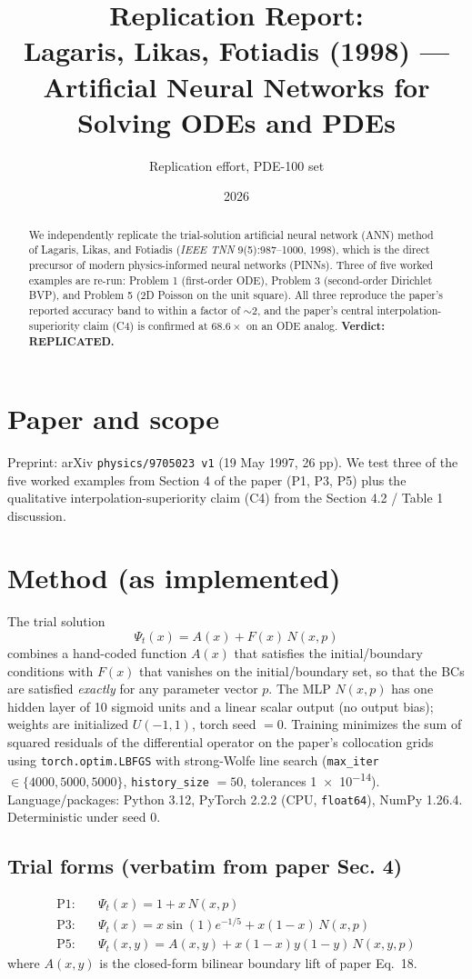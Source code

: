 \documentclass[11pt]{article}
\title{Replication Report:\\
Lagaris, Likas, Fotiadis (1998) --- Artificial Neural Networks for Solving ODEs and PDEs}
\author{Replication effort, PDE-100 set}
\date{2026}
\begin{document}
\maketitle

\begin{abstract}
We independently replicate the trial-solution artificial neural network (ANN)
method of Lagaris, Likas, and Fotiadis (\emph{IEEE TNN} 9(5):987--1000, 1998),
which is the direct precursor of modern physics-informed neural networks
(PINNs). Three of five worked examples are re-run: Problem 1 (first-order
ODE), Problem 3 (second-order Dirichlet BVP), and Problem 5 (2D Poisson on the
unit square). All three reproduce the paper's reported accuracy band to within
a factor of $\sim$2, and the paper's central interpolation-superiority claim
(C4) is confirmed at $68.6\times$ on an ODE analog. \textbf{Verdict:
REPLICATED.}
\end{abstract}

\section{Paper and scope}
Preprint: arXiv \texttt{physics/9705023 v1} (19 May 1997, 26 pp). We test three
of the five worked examples from Section 4 of the paper (P1, P3, P5) plus the
qualitative interpolation-superiority claim (C4) from the Section 4.2 / Table 1
discussion.

\section{Method (as implemented)}
The trial solution
\[
\Psi_t(x) = A(x) + F(x)\,N(x,p)
\]
combines a hand-coded function $A(x)$ that satisfies the initial/boundary
conditions with $F(x)$ that vanishes on the initial/boundary set, so that the
BCs are satisfied \emph{exactly} for any parameter vector $p$. The MLP
$N(x,p)$ has one hidden layer of 10 sigmoid units and a linear scalar output
(no output bias); weights are initialized $U(-1,1)$, torch seed $=0$. Training
minimizes the sum of squared residuals of the differential operator on the
paper's collocation grids using \texttt{torch.optim.LBFGS} with strong-Wolfe
line search (\texttt{max\_iter} $\in\{4000, 5000, 5000\}$, \texttt{history\_size}
$= 50$, tolerances \num{1e-14}). Language/packages: Python 3.12, PyTorch 2.2.2
(CPU, \texttt{float64}), NumPy 1.26.4. Deterministic under seed 0.

\subsection{Trial forms (verbatim from paper Sec. 4)}
\begin{align}
\text{P1:}\quad & \Psi_t(x) = 1 + x\,N(x,p) \\
\text{P3:}\quad & \Psi_t(x) = x\sin(1)e^{-1/5} + x(1-x)\,N(x,p) \\
\text{P5:}\quad & \Psi_t(x,y) = A(x,y) + x(1-x)y(1-y)\,N(x,y,p)
\end{align}
where $A(x,y)$ is the closed-form bilinear boundary lift of paper Eq.~18.
\end{document}
